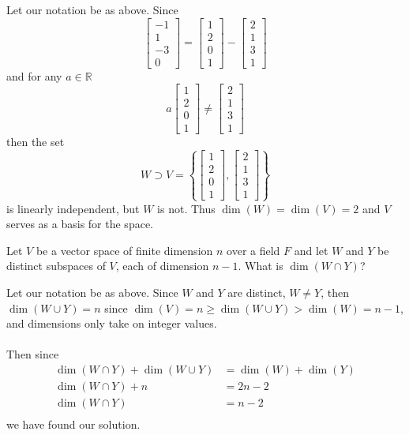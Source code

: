 \documentclass{article}
\begin{document}
\begin{solution}
Let our notation be as above. Since 
\[
\begin{bmatrix}
-1\\
1\\
-3\\
0
\end{bmatrix}
=
\begin{bmatrix}
1\\
2\\
0\\
1
\end{bmatrix}
-
\begin{bmatrix}
2\\
1\\
3\\
1
\end{bmatrix}
\]
and for any $a\in \mathbb{R}$
\[
a
\begin{bmatrix}
1\\
2\\
0\\
1
\end{bmatrix}
\ne
\begin{bmatrix}
2\\
1\\
3\\
1
\end{bmatrix}
\]
then the set 
\[
W \supset V=
\left\{
\begin{bmatrix}
1\\
2\\
0\\
1
\end{bmatrix}
,
\begin{bmatrix}
2\\
1\\
3\\
1
\end{bmatrix}
\right\}
\]
is linearly independent, but $W$ is not. Thus $\dim(W) = \dim(V) = 2$ and $V$ serves as a basis for the space.
\end{solution}

\setcounter{problem}{213}
\begin{problem}
Let $V$ be a vector space of finite dimension $n$ over a field $F$ and let $W$ and $Y$ be distinct subspaces of $V$, each of dimension $n-1$. What is $\dim(W\cap Y)$?
\end{problem}

\begin{solution}
Let our notation be as above. Since $W$ and $Y$ are distinct, $W\ne Y$, then $\dim(W\cup Y) = n$ since $\dim(V)=n\ge\dim(W\cup Y)>\dim(W)=n-1$, and dimensions only take on integer values.

\paragraph{}
Then since 
\begin{align*}
\dim(W\cap Y) + \dim(W\cup Y) &= \dim(W) + \dim(Y)\\
\dim(W\cap Y) + n &= 2n-2\\
\dim(W\cap Y) &= n-2\\
\end{align*}
we have found our solution.
\end{solution}
\end{document}

